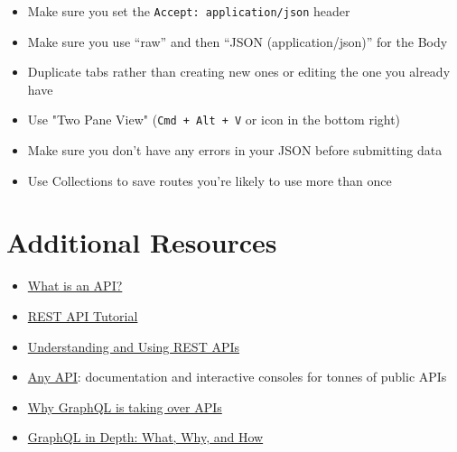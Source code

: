 \begin{itemize}[leftmargin=*]
    \item Make sure you set the \texttt{Accept: application/json} header


    \pagebreak

    \item Make sure you use ``raw'' and then ``JSON (application/json)'' for the Body


    \item Duplicate tabs rather than creating new ones or editing the one you already have


    \item Use "Two Pane View" (\texttt{Cmd + Alt + V} or icon in the bottom right)


    \item Make sure you don't have any errors in your JSON before submitting data


    \item Use Collections to save routes you're likely to use more than once
\end{itemize}



\section{Additional Resources}

\begin{itemize}[leftmargin=*]
    \item \href{https://www.howtogeek.com/343877/what-is-an-api/}{What is an API?}
    \item \href{https://restfulapi.net}{REST API Tutorial}
    \item \href{https://www.smashingmagazine.com/2018/01/understanding-using-rest-api/}{Understanding and Using REST APIs}
    \item \href{https://any-api.com}{Any API}: documentation and interactive consoles for tonnes of public APIs
    \item \href{https://webapplog.com/graphql/}{Why GraphQL is taking over APIs}
    \item \href{https://ponyfoo.com/articles/graphql-in-depth-what-why-and-how}{GraphQL in Depth: What, Why, and How}
\end{itemize}
